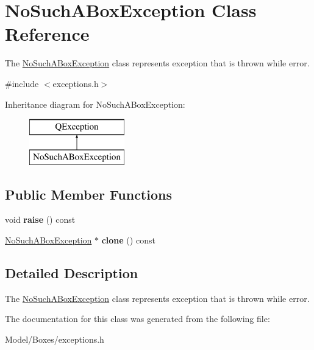 \hypertarget{class_no_such_a_box_exception}{\section{No\-Such\-A\-Box\-Exception Class Reference}
\label{class_no_such_a_box_exception}
}


The \hyperlink{class_no_such_a_box_exception}{No\-Such\-A\-Box\-Exception} class represents exception that is thrown while error.  




{\ttfamily \#include $<$exceptions.\-h$>$}

Inheritance diagram for No\-Such\-A\-Box\-Exception\-:\begin{figure}[H]
\begin{center}
\leavevmode
\includegraphics[height=2.000000cm]{class_no_such_a_box_exception}
\end{center}
\end{figure}
\subsection*{Public Member Functions}
\begin{DoxyCompactItemize}
\item 
\hypertarget{class_no_such_a_box_exception_a8e7a3bc3b9043ce902447846e4d03197}{void {\bfseries raise} () const }\label{class_no_such_a_box_exception_a8e7a3bc3b9043ce902447846e4d03197}

\item 
\hypertarget{class_no_such_a_box_exception_a2bbaca48346ae41db62615549e999593}{\hyperlink{class_no_such_a_box_exception}{No\-Such\-A\-Box\-Exception} $\ast$ {\bfseries clone} () const }\label{class_no_such_a_box_exception_a2bbaca48346ae41db62615549e999593}

\end{DoxyCompactItemize}


\subsection{Detailed Description}
The \hyperlink{class_no_such_a_box_exception}{No\-Such\-A\-Box\-Exception} class represents exception that is thrown while error. 

The documentation for this class was generated from the following file\-:\begin{DoxyCompactItemize}
\item 
Model/\-Boxes/exceptions.\-h\end{DoxyCompactItemize}
